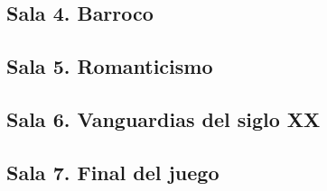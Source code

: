\subsection{Sala 4. Barroco}

\subsection{Sala 5. Romanticismo}

\subsection{Sala 6. Vanguardias del siglo XX}

\subsection{Sala 7. Final del juego}


